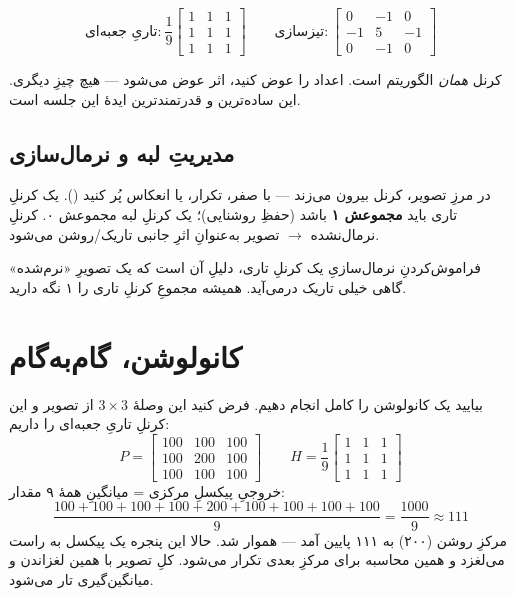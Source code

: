 \documentclass[12pt,a4paper]{article}
\begin{document}
\[
\text{تاریِ جعبه‌ای:}\ \frac{1}{9}\begin{bmatrix}1&1&1\\1&1&1\\1&1&1\end{bmatrix}
\qquad
\text{تیزسازی:}\ \begin{bmatrix}0&-1&0\\-1&5&-1\\0&-1&0\end{bmatrix}
\]

\begin{nokte}
کرنل \emph{همان} الگوریتم است. اعداد را عوض کنید، اثر عوض می‌شود — هیچ چیزِ دیگری. این ساده‌ترین
و قدرتمندترین ایدهٔ این جلسه است.
\end{nokte}

\subsection{مدیریتِ لبه و نرمال‌سازی}

در مرزِ تصویر، کرنل بیرون می‌زند — با صفر، تکرار، یا انعکاس پُر کنید (). یک کرنلِ
تاری باید \textbf{مجموعش ۱} باشد (حفظِ روشنایی)؛ یک کرنلِ لبه مجموعش ۰. کرنلِ نرمال‌نشده
$\rightarrow$ تصویر به‌عنوانِ اثرِ جانبی تاریک/روشن می‌شود.

\begin{hoshdar}
فراموش‌کردنِ نرمال‌سازیِ یک کرنلِ تاری، دلیلِ آن است که یک تصویرِ «نرم‌شده» گاهی خیلی تاریک درمی‌آید.
همیشه مجموعِ کرنلِ تاری را ۱ نگه دارید.
\end{hoshdar}

\section{کانولوشن، گام‌به‌گام}

بیایید یک کانولوشن را کامل انجام دهیم. فرض کنید این وصلهٔ $3\times3$ از تصویر و این کرنلِ تاریِ
جعبه‌ای را داریم:
\[
P=\begin{bmatrix}100&100&100\\100&200&100\\100&100&100\end{bmatrix}\qquad
H=\frac{1}{9}\begin{bmatrix}1&1&1\\1&1&1\\1&1&1\end{bmatrix}
\]
خروجیِ پیکسلِ مرکزی = میانگینِ همهٔ ۹ مقدار:
\[
\frac{100+100+100+100+200+100+100+100+100}{9} = \frac{1000}{9} \approx 111
\]
مرکزِ روشن (۲۰۰) به ۱۱۱ پایین آمد — هموار شد. حالا این پنجره یک پیکسل به راست می‌لغزد و همین
محاسبه برای مرکزِ بعدی تکرار می‌شود. کلِ تصویر با همین لغزاندن و میانگین‌گیری تار می‌شود.
\end{document}
